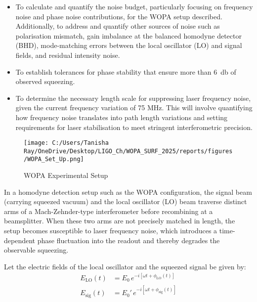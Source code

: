 \documentclass[colorlinks=true,pdfstartview=FitV,linkcolor=blue,
citecolor=red,urlcolor=magenta]{ligodoc}
\begin{document}
\begin{itemize}
    \item To calculate and quantify the noise budget, particularly focusing on frequency noise and phase noise contributions, for the WOPA setup described.  Additionally, to address and quantify other sources of noise such as polarisation mismatch, gain imbalance at the balanced homodyne detector (BHD), mode-matching errors between the local oscillator (LO) and signal fields, and residual intensity noise.
    \item To establish tolerances for phase stability that ensure more than \SI{6}{\decibel} of observed squeezing.
    \item To determine the necessary length scale for suppressing laser frequency noise,  given the current frequency variation of 75 MHz. This will involve quantifying how frequency noise translates into path length variations and setting requirements for laser stabilisation to meet stringent interferometric precision.
\end{itemize}

\begin{figure}[H]
    \centering
    \texttt{[image: C:/Users/Tanisha Ray/OneDrive/Desktop/LIGO\_Ch/WOPA\_SURF\_2025/reports/figures/WOPA\_Set\_Up.png]}
    \caption{WOPA Experimental Setup}
    \label{fig:example}
\end{figure}

In a homodyne detection setup such as the WOPA configuration, the signal beam (carrying squeezed vacuum) and the local oscillator (LO) beam traverse distinct arms of a Mach-Zehnder-type interferometer before recombining at a beamsplitter. When these two arms are not precisely matched in length, the setup becomes susceptible to laser frequency noise, which introduces a time-dependent phase fluctuation into the readout and thereby degrades the observable squeezing.

Let the electric fields of the local oscillator and the squeezed signal be given by:
\begin{align}
    E_{\text{LO}}(t) &= E_0 \, e^{-i[\omega t + \phi_{\text{LO}}(t)]} \\
    E_{\text{sig}}(t) &= E_0' \, e^{-i[\omega t + \phi_{\text{sig}}(t)]}
\end{align}
\end{document}
